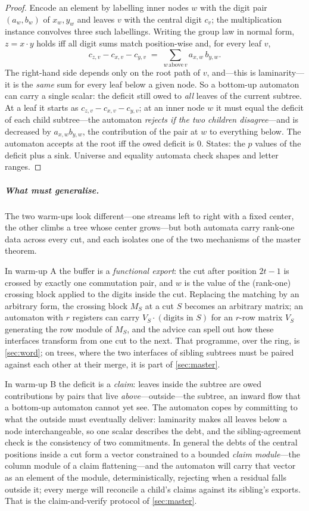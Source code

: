 \documentclass[a4paper,UKenglish,autoref,anonymous]{lipics-v2021}
\begin{document}
\begin{proof}
Encode an element by labelling inner nodes $w$ with the digit pair
$(a_w, b_w)$ of $x_w, y_w$ and leaves $v$ with the central digit $c_v$;
the multiplication instance convolves three such labellings. Writing the
group law in normal form, $z = x \cdot y$ holds iff all digit sums match
position-wise and, for every leaf $v$,
\[
  c_{z,v} - c_{x,v} - c_{y,v} \;=\; \sum_{w \,\text{above}\, v}
  a_{x,w}\, b_{y,w}.
\]
The right-hand side depends only on the root path of $v$, and---this is
laminarity---it is the \emph{same} sum for every leaf below a given node.
So a bottom-up automaton can carry a single scalar: the deficit still
owed to \emph{all} leaves of the current subtree. At a leaf it starts as
$c_{z,v} - c_{x,v} - c_{y,v}$; at an inner node $w$ it must equal the
deficit of each child subtree---the automaton \emph{rejects if the two
children disagree}---and is decreased by $a_{x,w} b_{y,w}$, the
contribution of the pair at $w$ to everything below. The automaton
accepts at the root iff the owed deficit is $0$. States: the $p$ values
of the deficit plus a sink. Universe and equality automata check shapes
and letter ranges.
\end{proof}

\subparagraph*{What must generalise.}
The two warm-ups look different---one streams left to right with a fixed
center, the other climbs a tree whose center grows---but both automata
carry rank-one data across every cut, and each isolates one of the two
mechanisms of the master theorem.

In warm-up A the buffer is a \emph{functional export}: the cut after
position $2t-1$ is crossed by exactly one commutation pair, and $w$ is
the value of the (rank-one) crossing block applied to the digits inside
the cut. Replacing the matching by an arbitrary form, the crossing block
$M_S$ at a cut $S$ becomes an arbitrary matrix; an automaton with $r$
registers can carry $V_S \cdot (\text{digits in } S)$ for an $r$-row
matrix $V_S$ generating the row module of $M_S$, and the advice can spell
out how these interfaces transform from one cut to the next. That
programme, over the ring, is \autoref{sec:word}; on trees, where the two
interfaces of sibling subtrees must be paired against each other at
their merge, it is part of \autoref{sec:master}.

In warm-up B the deficit is a \emph{claim}: leaves inside the subtree are
owed contributions by pairs that live \emph{above}---outside---the
subtree, an inward flow that a bottom-up automaton cannot yet see. The
automaton copes by committing to what the outside must eventually
deliver: laminarity makes all leaves below a node interchangeable, so one
scalar describes the debt, and the sibling-agreement check is the
consistency of two commitments. In general the debts of the central
positions inside a cut form a vector constrained to a bounded
\emph{claim module}---the column module of a claim flattening---and the
automaton will carry that vector as an element of the module,
deterministically, rejecting when a residual falls outside it; every
merge will reconcile a child's claims against its sibling's exports.
That is the claim-and-verify protocol of \autoref{sec:master}.
\end{document}
